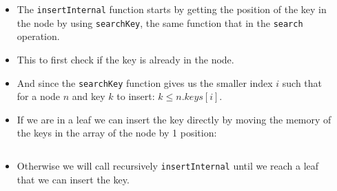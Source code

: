 \documentclass{beamer}
\begin{document}
\begin{frame}[t,allowframebreaks]
\begin{columns}
\begin{column}{\textlecolumn}
        \end{column}
        \begin{column}{\textricolumn}
        \end{column}
    \end{columns}
    \btreeInsert
    \begin{columns}
        \begin{column}{\textlecolumn}
            \begin{block}{}
                \begin{itemize}
                    \item The \lstinline|insertInternal| function starts by getting the position of the key in the node by using \lstinline|searchKey|, the same function that in the \lstinline|search| operation.
                    \item This to first check if the key is already in the node. 
                    \item And since the \lstinline|searchKey| function gives us the smaller index \(i\) such that for a node \(n\) and key \(k\) to insert: \(k \leq n.keys\left[i\right]\).
                    \item If we are in a leaf we can insert the key directly by moving the memory of the keys in the array of the node by 1 position:
                \end{itemize}
            \end{block}
        \end{column}
        \begin{column}{\textricolumn}
        \end{column}
    \end{columns}
    \btreeInsertInternalPartOne
    \vspace{-1cm}
    \begin{columns}
        \begin{column}{\textlecolumn}
            \begin{block}{}
                \begin{itemize}
                    \item Otherwise we will call recursively \lstinline|insertInternal| until we reach a leaf that we can insert the key.
                \end{itemize}
            \end{block}
        \end{column}
        \begin{column}{\textricolumn}
        \end{column}

\end{columns}
\end{frame}
\end{document}
